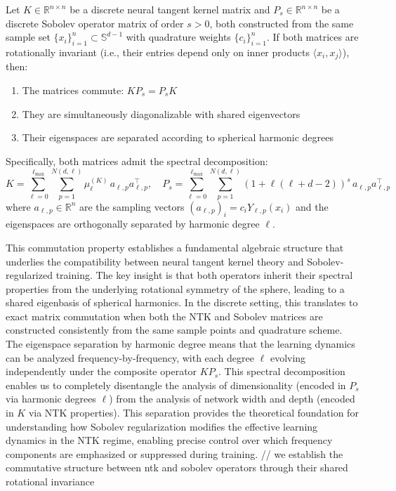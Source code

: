 \documentclass[a4paper]{article}
\begin{document}
\begin{theorem}
Let $K \in \mathbb{R}^{n \times n}$ be a discrete neural tangent kernel matrix and $P_s \in \mathbb{R}^{n \times n}$ be a discrete Sobolev operator matrix of order $s > 0$, both constructed from the same sample set $\{x_i\}_{i=1}^n \subset \mathbb{S}^{d-1}$ with quadrature weights $\{c_i\}_{i=1}^n$. If both matrices are rotationally invariant (i.e., their entries depend only on inner products $\langle x_i, x_j \rangle$), then:
\begin{enumerate}
    \item The matrices commute: $KP_s = P_sK$
    \item They are simultaneously diagonalizable with shared eigenvectors
    \item Their eigenspaces are separated according to spherical harmonic degrees
\end{enumerate}
Specifically, both matrices admit the spectral decomposition:
\[
K = \sum_{\ell=0}^{\ell_{\max}} \sum_{p=1}^{N(d,\ell)} \mu_\ell^{(K)} \, a_{\ell,p} a_{\ell,p}^\top, \quad
P_s = \sum_{\ell=0}^{\ell_{\max}} \sum_{p=1}^{N(d,\ell)} (1+\ell(\ell+d-2))^s \, a_{\ell,p} a_{\ell,p}^\top
\]
where $a_{\ell,p} \in \mathbb{R}^n$ are the sampling vectors $(a_{\ell,p})_i = c_i Y_{\ell,p}(x_i)$ and the eigenspaces are orthogonally separated by harmonic degree $\ell$.
\end{theorem}

This commutation property establishes a fundamental algebraic structure that underlies the compatibility between neural tangent kernel theory and Sobolev-regularized training. The key insight is that both operators inherit their spectral properties from the underlying rotational symmetry of the sphere, leading to a shared eigenbasis of spherical harmonics. In the discrete setting, this translates to exact matrix commutation when both the NTK and Sobolev matrices are constructed consistently from the same sample points and quadrature scheme. The eigenspace separation by harmonic degree means that the learning dynamics can be analyzed frequency-by-frequency, with each degree $\ell$ evolving independently under the composite operator $KP_s$. This spectral decomposition enables us to completely disentangle the analysis of dimensionality (encoded in $P_s$ via harmonic degrees $\ell$) from the analysis of network width and depth (encoded in $K$ via NTK properties). This separation provides the theoretical foundation for understanding how Sobolev regularization modifies the effective learning dynamics in the NTK regime, enabling precise control over which frequency components are emphasized or suppressed during training. // we establish the commutative structure between ntk and sobolev operators through their shared rotational invariance
\end{document}
